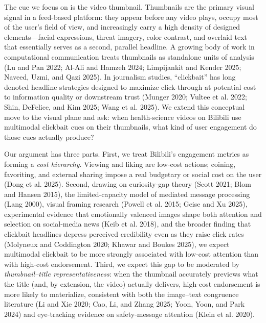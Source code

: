 \documentclass[
  12pt,
]{article}
\begin{document}
The cue we focus on is the video thumbnail. Thumbnails are the primary
visual signal in a feed-based platform: they appear before any video
plays, occupy most of the user's field of view, and increasingly carry a
high density of designed elements---facial expressions, threat imagery,
color contrast, and overlaid text that essentially serves as a second,
parallel headline. A growing body of work in computational communication
treats thumbnails as standalone units of analysis (Lu and Pan 2022;
Al-Ali and Hamzeh 2024; Limpijankit and Kender 2025; Naveed, Uzmi, and
Qazi 2025). In journalism studies, ``clickbait'' has long denoted
headline strategies designed to maximize click-through at potential cost
to information quality or downstream trust (Munger 2020; Vultee et al.
2022; Shin, DeFelice, and Kim 2025; Wang et al. 2025). We extend this
conceptual move to the visual plane and ask: when health-science videos
on Bilibili use multimodal clickbait cues on their thumbnails, what kind
of user engagement do those cues actually produce?

Our argument has three parts. First, we treat Bilibili's engagement
metrics as forming a \emph{cost hierarchy}. Viewing and liking are
low-cost actions; coining, favoriting, and external sharing impose a
real budgetary or social cost on the user (Dong et al. 2025). Second,
drawing on curiosity-gap theory (Scott 2021; Blom and Hansen 2015), the
limited-capacity model of mediated message processing (Lang 2000),
visual framing research (Powell et al. 2015; Geise and Xu 2025),
experimental evidence that emotionally valenced images shape both
attention and selection on social-media news (Keib et al. 2018), and the
broader finding that clickbait headlines depress perceived credibility
even as they raise click rates (Molyneux and Coddington 2020; Khawar and
Boukes 2025), we expect multimodal clickbait to be more strongly
associated with low-cost attention than with high-cost endorsement.
Third, we expect this gap to be moderated by \emph{thumbnail--title
representativeness}: when the thumbnail accurately previews what the
title (and, by extension, the video) actually delivers, high-cost
endorsement is more likely to materialize, consistent with both the
image--text congruence literature (Li and Xie 2020; Cao, Li, and Zhang
2025; Yoon, Yoon, and Park 2024) and eye-tracking evidence on
safety-message attention (Klein et al. 2020).
\end{document}
